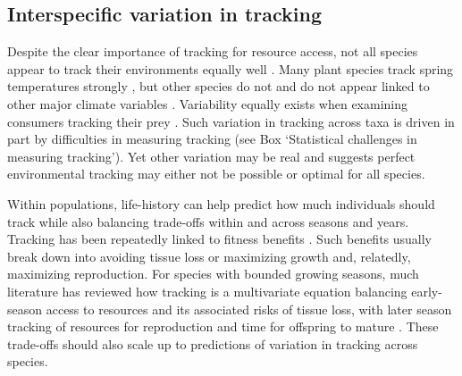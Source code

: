 \documentclass[11pt,letterpaper]{article}
\begin{document}
\subsection{Interspecific variation in tracking}
Despite the clear importance of tracking for resource access, not all species appear to track their environments equally well \citep{thackeray2016}. Many plant species track spring temperatures strongly \citep[multiple meta-analyses now show plants' spring phenology on average track spring or annual temperatures 4-6 days/$\degree$C][and simple temperature models can often explain over 90\% of interannual variation in phenology]{Richardson:2006qh,Wolkovich:2012n,thackeray2016}, but other species do not \citep{Cook:2012pnas} and do not appear linked to other major climate variables \citep{thackeray2016}. Variability equally exists when examining consumers tracking their prey \citep[across diverse species tracking over time is 6.1 days/decade but ranges from zero to 15 days/decade, see][]{kharouba2018}. Such variation in tracking across taxa is driven in part by difficulties in measuring tracking (see Box `Statistical challenges in measuring tracking'). Yet other variation may be real and suggests perfect environmental tracking may either not be possible or optimal for all species. 

Within populations, life-history can help predict how much individuals should track while also balancing trade-offs within and across seasons and years. Tracking has been repeatedly linked to fitness benefits \citep[e.g.,][]{farzan2018,deacy2018}. Such benefits usually break down into avoiding tissue loss or maximizing growth and, relatedly, maximizing reproduction. For species with bounded growing seasons, much literature has reviewed how tracking is a multivariate equation balancing early-season access to resources and its associated risks of tissue loss, with later season tracking of resources for reproduction and time for offspring to mature \citep{donohue2002,Morin:2005ye,Burghardt2015}. These trade-offs should also scale up to predictions of variation in tracking across species. %
\end{document}
